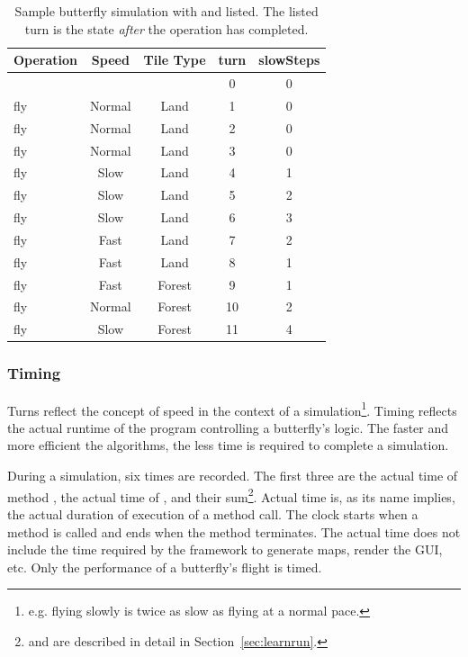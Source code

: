 \documentclass{pset}
\begin{document}
\begin{table}[H]
    \centering
    \begin{tabular}{|l|c|c|c|c|}
        \hline
        \textbf{Operation} & \textbf{Speed} &  \textbf{Tile Type} &
        \textbf{turn} & \textbf{slowSteps} \\\hline
                      &        &        & 0 & 0 \\\hline
        fly & Normal & Land   & 1 & 0 \\\hline 
        fly & Normal & Land   & 2 & 0 \\\hline 
        fly & Normal & Land   & 3 & 0 \\\hline 
        fly & Slow   & Land   & 4 & 1 \\\hline 
        fly & Slow   & Land   & 5 & 2 \\\hline 
        fly & Slow   & Land   & 6 & 3 \\\hline 
        fly & Fast   & Land   & 7 & 2 \\\hline 
        fly & Fast   & Land   & 8 & 1 \\\hline
        fly & Fast   & Forest & 9 & 1 \\\hline  
        fly & Normal & Forest & 10 & 2 \\\hline  
        fly & Slow   & Forest & 11 & 4 \\\hline  
    \end{tabular}
    \caption{Sample butterfly simulation with  and 
        listed. The listed turn is the state \textit{after} the operation has
    completed.} \label{table:turns}
\end{table}

\subsubsection{Timing}
Turns reflect the concept of speed in the context of a simulation\footnote{e.g.
flying slowly is twice as slow as flying at a normal pace.}. Timing reflects
the actual runtime  of the program controlling a butterfly's logic. The faster
and more efficient the algorithms, the less time is required to complete a
simulation.

During a simulation, six times are recorded. The first three are the actual
time of method , the actual time of , and their
sum\footnote{ and  are described in detail in
Section~\ref{sec:learnrun}.}. Actual time is, as its name implies, the actual
duration of execution of a method call. The clock starts when a method is
called and ends when the method terminates. The actual time does not include
the time required by the framework to generate maps, render the GUI, etc. Only
the performance of a butterfly's flight is timed. 
\end{document}
